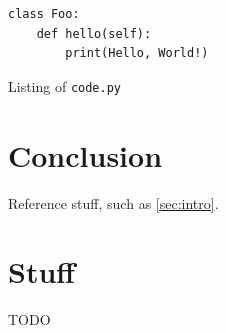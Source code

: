 \documentclass{article}
\newcommand{\pyinline}[1]{\texttt{#1}}
\begin{document}
\begin{listing}
    \begin{verbatim}
class Foo:
    def hello(self):
        print(Hello, World!)
    \end{verbatim}
    \caption{Listing of \pyinline{code.py}}
    \label{lst:code}
\end{listing}

\section{Conclusion}

Reference stuff, such as \cref{sec:intro}.

%
%
\printbibliography

\appendix

\section{Stuff}
TODO
\end{document}
